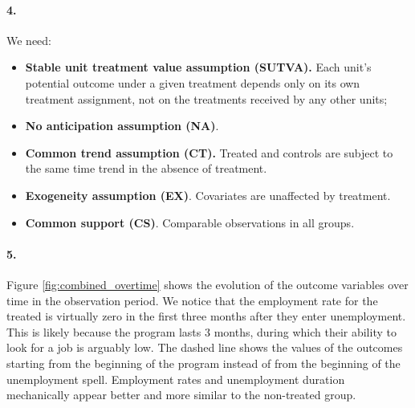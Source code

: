 \documentclass{scrartcl}
\begin{document}
\paragraph*{4.}

We need:

\begin{itemize}[label=$\blacktriangleright$]
    \item \textbf{Stable unit treatment value assumption (SUTVA).} Each unit’s potential outcome under a given treatment depends only on its own treatment assignment, not on the treatments received by any other units;\
    \item \textbf{No anticipation assumption (NA)}. \
    \item \textbf{Common trend assumption (CT).} Treated and controls are subject to the same time trend in the absence of treatment. \
    \item \textbf{Exogeneity assumption (EX)}. Covariates are unaffected by treatment.\ 
    \item \textbf{Common support (CS)}. Comparable observations in all groups.
\end{itemize}

\paragraph*{5.}

Figure \ref{fig:combined_overtime} shows the evolution of the outcome variables over time in the observation period. We notice that the employment rate for the treated is virtually zero in the first three months after they enter unemployment. This is likely because the program lasts 3 months, during which their ability to look for a job is arguably low. The dashed line shows the values of the outcomes starting from the beginning of the program instead of from the beginning of the unemployment spell. Employment rates and unemployment duration mechanically appear better and more similar to the non-treated group.
\end{document}
